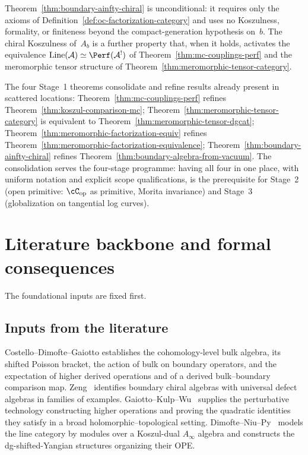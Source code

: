 \begin{remark}
\label{rem:boundary-ainfty-unconditional}
Theorem~\ref{thm:boundary-ainfty-chiral} is unconditional:
it requires only the axioms of
Definition~\ref{def:oc-factorization-category} and uses no
Koszulness, formality, or finiteness beyond the compact-generation
hypothesis on~$b$. The chiral Koszulness of~$A_b$ is a further
property that, when it holds, activates the equivalence
$\operatorname{Line}(\cA) \simeq \Perf(\cA^!)$ of
Theorem~\ref{thm:mc-couplings-perf} and the meromorphic tensor
structure of Theorem~\ref{thm:meromorphic-tensor-category}.
\end{remark}

\begin{remark}
\label{rem:stage1-cross-references}
The four Stage~1 theorems consolidate and refine results
already present in scattered locations:
Theorem~\ref{thm:mc-couplings-perf} refines
Theorem~\ref{thm:koszul-comparison-mc};
Theorem~\ref{thm:meromorphic-tensor-category} is equivalent to
Theorem~\ref{thm:meromorphic-tensor-dgcat};
Theorem~\ref{thm:meromorphic-factorization-equiv} refines
Theorem~\ref{thm:meromorphic-factorization-equivalence};
Theorem~\ref{thm:boundary-ainfty-chiral} refines
Theorem~\ref{thm:boundary-algebra-from-vacuum}.
The consolidation serves the four-stage programme: having
all four in one place, with uniform notation and explicit
scope qualifications, is the prerequisite for Stage~2
(open primitive: $\cC_{\mathrm{op}}$ as primitive, Morita
invariance) and Stage~3 (globalization on tangential log curves).
\end{remark}


\section{Literature backbone and formal consequences}\label{sec:backbone}

The foundational inputs are fixed first.

\subsection{Inputs from the literature}

Costello--Dimofte--Gaiotto \cite{CDG20} establishes the cohomology-level bulk algebra, its shifted Poisson bracket, the action of bulk on boundary operators, and the expectation of higher derived operations and of a derived bulk--boundary comparison map. Zeng~\cite{Zeng23} identifies boundary chiral algebras with universal defect algebras in families of examples. Gaiotto--Kulp--Wu~\cite{GKW24} supplies the perturbative technology constructing higher operations and proving the quadratic identities they satisfy in a broad holomorphic--topological setting. Dimofte--Niu--Py~\cite{DNP25} models the line category by modules over a Koszul-dual $A_\infty$ algebra and constructs the dg-shifted-Yangian structures organizing their OPE.

